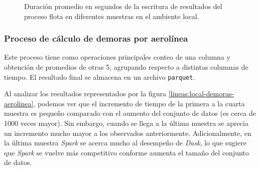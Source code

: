 \begin{figure}
\centering
{}
\caption{Duración promedio en segundos de la escritura de resultados del proceso flota en diferentes muestras en el ambiente local.}
\label{lineas:local-flota-write}
\end{figure}

\subsubsection{Proceso de cálculo de demoras por aerolínea}

Este proceso tiene como operaciones principales conteo de una columna y obtención de promedios de otras 5, agrupando respecto a distintas columnas de tiempo. El resultado final se almacena en un archivo \texttt{parquet}.

Al analizar los resultados representados por la figura \ref{lineas:local-demoras-aerolinea}, podemos ver que el incremento de tiempo de la primera a la cuarta muestra es pequeño comparado con el aumento del conjunto de datos (es cerca de 1000 veces mayor). Sin embargo, cuando se llega a la última muestra se aprecia un incremento mucho mayor a los observados anteriormente. Adicionalmente, en la última muestra \textit{Spark} se acerca mucho al desempeño de \textit{Dask}, lo que sugiere que \textit{Spark} se vuelve más competitivo conforme aumenta el tamaño del conjunto de datos. 

